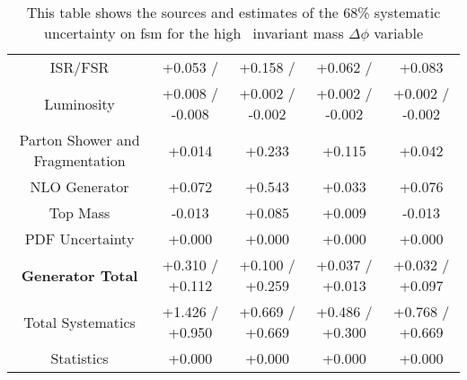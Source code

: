 \begin{table}[htbp]
\begin{center}
\begin{tabular}{|c|c|c|c|c|}
ISR/FSR                               &+0.053   /          & +0.158   /          & +0.062   /          & +0.083             \\
Luminosity                            &+0.008   / -0.008   & +0.002   / -0.002   & +0.002   / -0.002   & +0.002   / -0.002  \\
Parton Shower and Fragmentation       &+0.014              & +0.233              & +0.115              & +0.042             \\
NLO Generator                         &+0.072              & +0.543              & +0.033              & +0.076             \\
Top Mass                              &-0.013              & +0.085              & +0.009              & -0.013             \\
PDF Uncertainty                       &+0.000              & +0.000              & +0.000              & +0.000             \\
\hline
\textbf{Generator Total}              &+0.310   / +0.112   & +0.100   / +0.259   & +0.037   / +0.013   & +0.032   / +0.097  \\
\hline
\hline
Total Systematics                     &+1.426   / +0.950   & +0.669   / +0.669   & +0.486   / +0.300   & +0.768   / +0.669  \\
Statistics                            &+0.000              & +0.000              & +0.000              & +0.000             \\
\hline
  \end{tabular}
  \end{center} 
  \label{tab:fsm_nominal_deltaPhi_high}
  \caption{This table shows the sources and estimates of the 68\% systematic uncertainty on fsm for the high \ttbar\ invariant mass $\Delta\phi$ variable}
\end{table}
 
